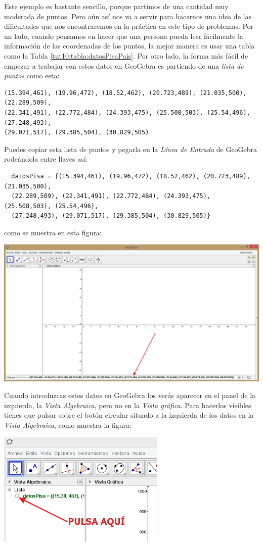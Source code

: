 \documentclass[10pt,a4paper]{article}\usepackage[]{graphicx}\usepackage[]{color}
\newcounter {cont01}
\begin{document}
Este ejemplo es bastante sencillo, porque partimos de una cantidad muy moderada de puntos. Pero aún así nos va a servir para hacernos una idea de las dificultades que nos encontraremos en la práctica en este tipo de problemas. Por un lado, cuando pensamos en hacer que una persona pueda leer fácilmente la información de las coordenadas de los puntos, la mejor manera es usar una tabla como la Tabla \ref{tut10:tabla:datosPisaPais}. Por otro lado, la forma más fácil de empezar a trabajar con estos datos en GeoGebra es partiendo de una {\em lista de puntos} como esta:
\begin{verbatim}
(15.394,461), (19.96,472), (18.52,462), (20.723,489), (21.035,500), (22.289,509),
(22.341,491), (22.772,484), (24.393,475), (25.508,503), (25.54,496), (27.248,493),
(29.071,517), (29.385,504), (30.829,505)
\end{verbatim}
Puedes copiar esta lista de puntos y pegarla en la {\em Línea de Entrada} de GeoGebra rodeándola entre llaves así:
\begin{verbatim}
  datosPisa = {(15.394,461), (19.96,472), (18.52,462), (20.723,489), (21.035,500),
  (22.289,509), (22.341,491), (22.772,484), (24.393,475), (25.508,503), (25.54,496),
  (27.248,493), (29.071,517), (29.385,504), (30.829,505)}
\end{verbatim}
como se muestra en esta figura:
\begin{center}
    \includegraphics[width=16cm]{../fig/Tut10-11.png}
\end{center}
Cuando introduzcas estos datos en GeoGebra los verás aparecer en el panel de la izquierda, la {\em Vista Algebraica}, pero no en la {\em Vista gráfica}. Para hacerlos visibles tienes que pulsar sobre el botón circular situado a la izquierda de los datos en la {\em Vista Algebraica}, como muestra la figura:
\begin{center}
    \includegraphics[width=8cm]{../fig/Tut10-12.png}
\end{center}
\end{document}
